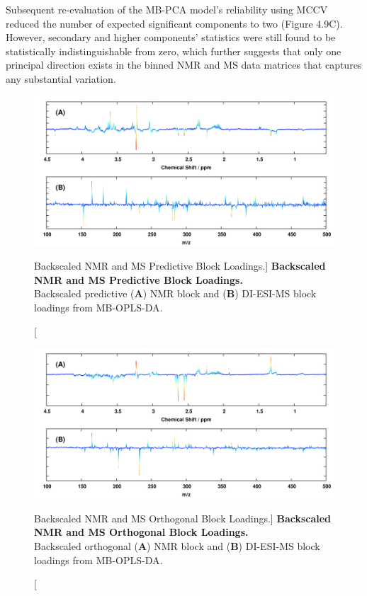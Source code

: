 \begin{doublespace}
Subsequent re-evaluation of the MB-PCA model's reliability using MCCV reduced
the number of expected significant components to two (Figure 4.9C). However,
secondary and higher components' \qsq{} statistics were still found to be
statistically indistinguishable from zero, which further suggests that only
one principal direction exists in the binned NMR and MS data matrices that
captures any substantial variation.
\end{doublespace}

\begin{figure}[ht!]
\includegraphics[width=6.5in]{figs/apps/12-mbopls-p.png}
\caption
      [Backscaled NMR and MS Predictive Block Loadings.]{
  {\bf Backscaled NMR and MS Predictive Block Loadings.}
  \\
  Backscaled predictive ({\bf A}) \hnmr{} NMR block and ({\bf B}) DI-ESI-MS
  block loadings from MB-OPLS-DA.
}
\label{figure.4.12}
\end{figure}

\begin{figure}[ht!]
\includegraphics[width=6.5in]{figs/apps/13-mbopls-po.png}
\caption
      [Backscaled NMR and MS Orthogonal Block Loadings.]{
  {\bf Backscaled NMR and MS Orthogonal Block Loadings.}
  \\
  Backscaled orthogonal ({\bf A}) \hnmr{} NMR block and ({\bf B}) DI-ESI-MS
  block loadings from MB-OPLS-DA.
}
\label{figure.4.13}
\end{figure}

